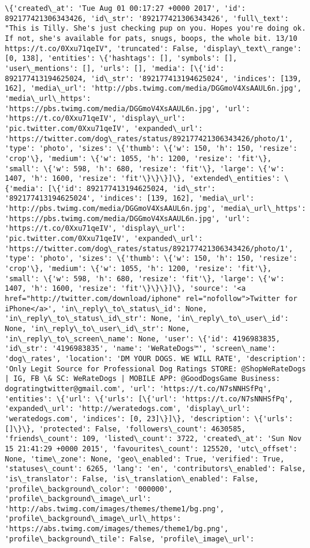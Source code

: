 \documentclass[11pt]{article}
\begin{document}
\begin{Verbatim}[commandchars=\\\{\}]
\{'created\_at': 'Tue Aug 01 00:17:27 +0000 2017', 'id': 892177421306343426, 'id\_str': '892177421306343426', 'full\_text': "This is Tilly. She's just checking pup on you. Hopes you're doing ok. If not, she's available for pats, snugs, boops, the whole bit. 13/10 https://t.co/0Xxu71qeIV", 'truncated': False, 'display\_text\_range': [0, 138], 'entities': \{'hashtags': [], 'symbols': [], 'user\_mentions': [], 'urls': [], 'media': [\{'id': 892177413194625024, 'id\_str': '892177413194625024', 'indices': [139, 162], 'media\_url': 'http://pbs.twimg.com/media/DGGmoV4XsAAUL6n.jpg', 'media\_url\_https': 'https://pbs.twimg.com/media/DGGmoV4XsAAUL6n.jpg', 'url': 'https://t.co/0Xxu71qeIV', 'display\_url': 'pic.twitter.com/0Xxu71qeIV', 'expanded\_url': 'https://twitter.com/dog\_rates/status/892177421306343426/photo/1', 'type': 'photo', 'sizes': \{'thumb': \{'w': 150, 'h': 150, 'resize': 'crop'\}, 'medium': \{'w': 1055, 'h': 1200, 'resize': 'fit'\}, 'small': \{'w': 598, 'h': 680, 'resize': 'fit'\}, 'large': \{'w': 1407, 'h': 1600, 'resize': 'fit'\}\}\}]\}, 'extended\_entities': \{'media': [\{'id': 892177413194625024, 'id\_str': '892177413194625024', 'indices': [139, 162], 'media\_url': 'http://pbs.twimg.com/media/DGGmoV4XsAAUL6n.jpg', 'media\_url\_https': 'https://pbs.twimg.com/media/DGGmoV4XsAAUL6n.jpg', 'url': 'https://t.co/0Xxu71qeIV', 'display\_url': 'pic.twitter.com/0Xxu71qeIV', 'expanded\_url': 'https://twitter.com/dog\_rates/status/892177421306343426/photo/1', 'type': 'photo', 'sizes': \{'thumb': \{'w': 150, 'h': 150, 'resize': 'crop'\}, 'medium': \{'w': 1055, 'h': 1200, 'resize': 'fit'\}, 'small': \{'w': 598, 'h': 680, 'resize': 'fit'\}, 'large': \{'w': 1407, 'h': 1600, 'resize': 'fit'\}\}\}]\}, 'source': '<a href="http://twitter.com/download/iphone" rel="nofollow">Twitter for iPhone</a>', 'in\_reply\_to\_status\_id': None, 'in\_reply\_to\_status\_id\_str': None, 'in\_reply\_to\_user\_id': None, 'in\_reply\_to\_user\_id\_str': None, 'in\_reply\_to\_screen\_name': None, 'user': \{'id': 4196983835, 'id\_str': '4196983835', 'name': 'WeRateDogs™', 'screen\_name': 'dog\_rates', 'location': 'DM YOUR DOGS. WE WILL RATE', 'description': 'Only Legit Source for Professional Dog Ratings STORE: @ShopWeRateDogs | IG, FB \& SC: WeRateDogs | MOBILE APP: @GoodDogsGame Business: dogratingtwitter@gmail.com', 'url': 'https://t.co/N7sNNHSfPq', 'entities': \{'url': \{'urls': [\{'url': 'https://t.co/N7sNNHSfPq', 'expanded\_url': 'http://weratedogs.com', 'display\_url': 'weratedogs.com', 'indices': [0, 23]\}]\}, 'description': \{'urls': []\}\}, 'protected': False, 'followers\_count': 4630585, 'friends\_count': 109, 'listed\_count': 3722, 'created\_at': 'Sun Nov 15 21:41:29 +0000 2015', 'favourites\_count': 125520, 'utc\_offset': None, 'time\_zone': None, 'geo\_enabled': True, 'verified': True, 'statuses\_count': 6265, 'lang': 'en', 'contributors\_enabled': False, 'is\_translator': False, 'is\_translation\_enabled': False, 'profile\_background\_color': '000000', 'profile\_background\_image\_url': 'http://abs.twimg.com/images/themes/theme1/bg.png', 'profile\_background\_image\_url\_https': 'https://abs.twimg.com/images/themes/theme1/bg.png', 'profile\_background\_tile': False, 'profile\_image\_url': 
\end{Verbatim}
\end{document}
